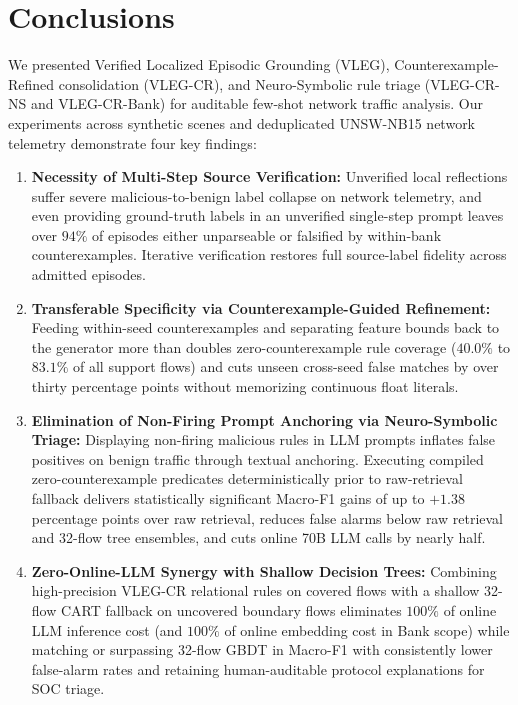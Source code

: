 \documentclass[11pt,letterpaper,onecolumn]{article}
\begin{document}
\section{Conclusions}
We presented Verified Localized Episodic Grounding (VLEG), Counterexample-Refined consolidation (VLEG-CR), and Neuro-Symbolic rule triage (VLEG-CR-NS and VLEG-CR-Bank) for auditable few-shot network traffic analysis. Our experiments across synthetic scenes and deduplicated UNSW-NB15 network telemetry demonstrate four key findings:
\begin{enumerate}[leftmargin=1.8em,topsep=2pt,itemsep=2pt]
    \item \textbf{Necessity of Multi-Step Source Verification:} Unverified local reflections suffer severe malicious-to-benign label collapse on network telemetry, and even providing ground-truth labels in an unverified single-step prompt leaves over $94\%$ of episodes either unparseable or falsified by within-bank counterexamples. Iterative verification restores full source-label fidelity across admitted episodes.
    \item \textbf{Transferable Specificity via Counterexample-Guided Refinement:} Feeding within-seed counterexamples and separating feature bounds back to the generator more than doubles zero-counterexample rule coverage ($40.0\%$ to $83.1\%$ of all support flows) and cuts unseen cross-seed false matches by over thirty percentage points without memorizing continuous float literals.
    \item \textbf{Elimination of Non-Firing Prompt Anchoring via Neuro-Symbolic Triage:} Displaying non-firing malicious rules in LLM prompts inflates false positives on benign traffic through textual anchoring. Executing compiled zero-counterexample predicates deterministically prior to raw-retrieval fallback delivers statistically significant Macro-F1 gains of up to $+1.38$ percentage points over raw retrieval, reduces false alarms below raw retrieval and 32-flow tree ensembles, and cuts online 70B LLM calls by nearly half.
    \item \textbf{Zero-Online-LLM Synergy with Shallow Decision Trees:} Combining high-precision VLEG-CR relational rules on covered flows with a shallow 32-flow CART fallback on uncovered boundary flows eliminates $100\%$ of online LLM inference cost (and $100\%$ of online embedding cost in Bank scope) while matching or surpassing 32-flow GBDT in Macro-F1 with consistently lower false-alarm rates and retaining human-auditable protocol explanations for SOC triage.
\end{enumerate}
\end{document}
